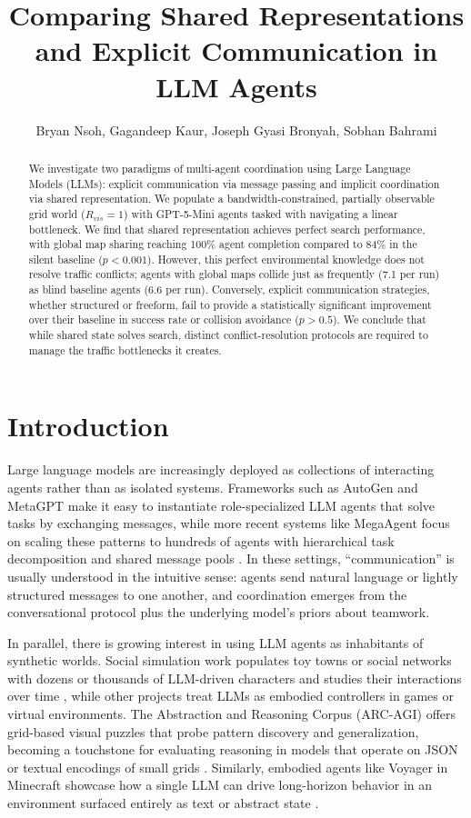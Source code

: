 \documentclass[10pt,twocolumn]{article}
\title{Comparing Shared Representations and Explicit Communication in LLM Agents}
\author{\small Bryan Nsoh, Gagandeep Kaur, Joseph Gyasi Bronyah, Sobhan Bahrami}
\date{}
\begin{document}
\maketitle

\begin{abstract}
We investigate two paradigms of multi-agent coordination using Large Language Models (LLMs): explicit communication via message passing and implicit coordination via shared representation. We populate a bandwidth-constrained, partially observable grid world ($R_{vis}=1$) with GPT-5-Mini agents tasked with navigating a linear bottleneck. We find that shared representation achieves perfect search performance, with global map sharing reaching 100\% agent completion compared to 84\% in the silent baseline ($p < 0.001$). However, this perfect environmental knowledge does not resolve traffic conflicts; agents with global maps collide just as frequently (7.1 per run) as blind baseline agents (6.6 per run). Conversely, explicit communication strategies, whether structured or freeform, fail to provide a statistically significant improvement over their baseline in success rate or collision avoidance ($p > 0.5$). We conclude that while shared state solves search, distinct conflict-resolution protocols are required to manage the traffic bottlenecks it creates.
\end{abstract}

\section{Introduction}

Large language models are increasingly deployed as collections of interacting agents rather than as isolated systems. Frameworks such as AutoGen and MetaGPT make it easy to instantiate role-specialized LLM agents that solve tasks by exchanging messages, while more recent systems like MegaAgent focus on scaling these patterns to hundreds of agents with hierarchical task decomposition and shared message pools \citep{wu2023autogen,hong2023metagpt,wang2024megaagent}. In these settings, ``communication'' is usually understood in the intuitive sense: agents send natural language or lightly structured messages to one another, and coordination emerges from the conversational protocol plus the underlying model's priors about teamwork.

In parallel, there is growing interest in using LLM agents as inhabitants of synthetic worlds. Social simulation work populates toy towns or social networks with dozens or thousands of LLM-driven characters and studies their interactions over time \citep{park2023generative}, while other projects treat LLMs as embodied controllers in games or virtual environments. The Abstraction and Reasoning Corpus (ARC-AGI) offers grid-based visual puzzles that probe pattern discovery and generalization, becoming a touchstone for evaluating reasoning in models that operate on JSON or textual encodings of small grids \citep{chollet2019measure,arcprize2025arcagi}. Similarly, embodied agents like Voyager in Minecraft showcase how a single LLM can drive long-horizon behavior in an environment surfaced entirely as text or abstract state \citep{wang2023voyager,robison2025claudepokemon}.
\end{document}
